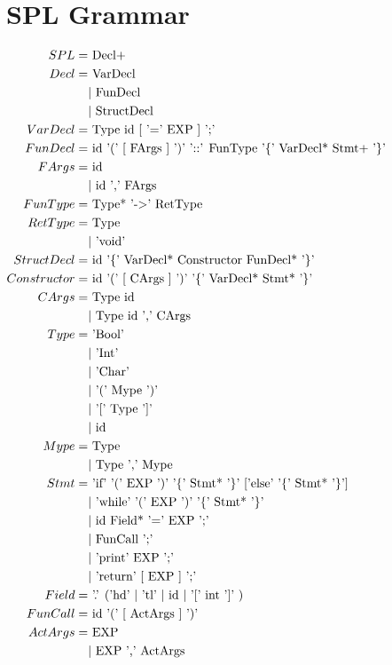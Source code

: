 \documentclass[10pt,a4paper]{article}
\begin{document}
\section{SPL Grammar}
\begin{math}
\centering
\begin{aligned}
SPL =& \text{ Decl+}\\
Decl  =& \text{ VarDecl}
 \\&| \text{ FunDecl }
 \\&| \text{ StructDecl}\\
VarDecl =& \text{ Type id [ '=' EXP ] ';'}\\
FunDecl =& \text{ id '(' [ FArgs ] ')' '::' FunType '\{' VarDecl* Stmt+ '\}' }\\
FArgs =& \text{ id }
 \\&| \text{ id ',' FArgs}\\
FunType =& \text{ Type* '-$>$' RetType}\\
RetType =& \text{ Type}
 \\ &| \text{ 'void'} \\
StructDecl =& \text{ id '\{' VarDecl* Constructor FunDecl* '\}'}\\
Constructor =&\text{ id '(' [ CArgs ] ')' '\{' VarDecl* Stmt* '\}' }\\
CArgs =& \text{ Type id }
 \\&| \text{ Type id ',' CArgs}\\
Type =& \text{ 'Bool'}
 \\&| \text{ 'Int'}
 \\&| \text{ 'Char'}
 \\&| \text{ '(' Mype ')'} 
 \\&| \text{ '[' Type ']'} 
 \\&|\text{ id }\\
Mype =&\text{ Type}
 \\&|\text{ Type ',' Mype}\\
Stmt =&\text{ 'if' '(' EXP ')' '\{' Stmt* '\}' ['else' '\{' Stmt* '\}']}
 \\&|\text{ 'while' '(' EXP ')' '\{' Stmt* '\}'}
 \\&|\text{ id Field* '=' EXP ';'}
 \\&|\text{ FunCall ';'}
 \\&|\text{ 'print' EXP ';'}
 \\&|\text{ 'return' [ EXP ] ';' }\\
Field =&\text{ '.' ('hd' $|$ 'tl' $|$ id $|$ '[' int ']' ) }\\
FunCall =&\text{ id '(' [ ActArgs ] ')'} \\
ActArgs =&\text{ EXP }
 \\&|\text{ EXP ',' ActArgs }
\end{aligned}
\end{math}
\end{document}
